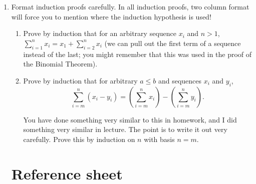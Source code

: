 \documentclass[12pt]{article}
\begin{document}
\begin{enumerate}
\begin{enumerate}

\end{enumerate}

\newpage

\item 

Format induction proofs carefully.  In all induction proofs, two column format will force you to mention where the induction hypothesis is used!

\begin{enumerate}
\item  Prove by induction that for an arbitrary sequence $x_i$ and $n>1$, $\sum_{i=1}^n x_i = x_1 + \sum_{i=2}^n x_i$ (we can pull out the first term of a sequence instead of the last;  you might remember that this was used in the proof of the Binomial Theorem).

\newpage

\item Prove by induction that for arbitrary $a \leq b$ and sequences $x_i$ and $y_i$, $$\sum_{i=m}^n (x_i-y_i) = (\sum_{i=m}^n x_i) - (\sum_{i=m}^n y_i).$$

You have done something very similar to this in homework, and I did something very similar in lecture.  The point is to write it out very carefully.    Prove
this by induction on $n$ with  basis $n=m$.
\end{enumerate}



\newpage

\section{Reference sheet}



\end{enumerate}
\end{document}
